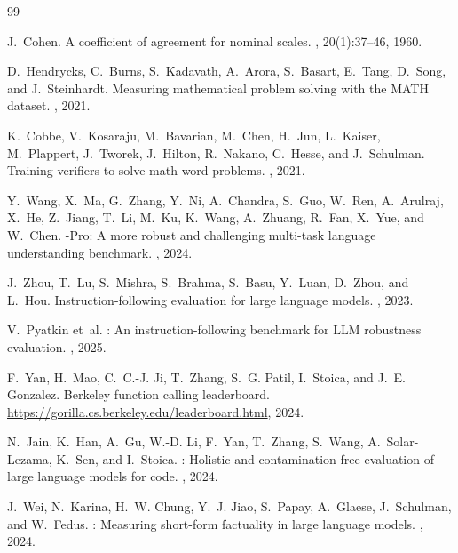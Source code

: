 \documentclass[11pt,a4paper]{article}
\begin{document}
\begin{thebibliography}{99}

J.~Cohen.
\newblock A coefficient of agreement for nominal scales.
, 20(1):37--46, 1960.

D.~Hendrycks, C.~Burns, S.~Kadavath, A.~Arora, S.~Basart, E.~Tang, D.~Song, and J.~Steinhardt.
\newblock Measuring mathematical problem solving with the {MATH} dataset.
, 2021.

K.~Cobbe, V.~Kosaraju, M.~Bavarian, M.~Chen, H.~Jun, L.~Kaiser, M.~Plappert, J.~Tworek, J.~Hilton, R.~Nakano, C.~Hesse, and J.~Schulman.
\newblock Training verifiers to solve math word problems.
, 2021.

Y.~Wang, X.~Ma, G.~Zhang, Y.~Ni, A.~Chandra, S.~Guo, W.~Ren, A.~Arulraj, X.~He, Z.~Jiang, T.~Li, M.~Ku, K.~Wang, A.~Zhuang, R.~Fan, X.~Yue, and W.~Chen.
-{Pro}: A more robust and challenging multi-task language understanding benchmark.
, 2024.

J.~Zhou, T.~Lu, S.~Mishra, S.~Brahma, S.~Basu, Y.~Luan, D.~Zhou, and L.~Hou.
\newblock Instruction-following evaluation for large language models.
, 2023.

V.~Pyatkin et~al.
: An instruction-following benchmark for {LLM} robustness evaluation.
, 2025.

F.~Yan, H.~Mao, C.~C.-J. Ji, T.~Zhang, S.~G. Patil, I.~Stoica, and J.~E. Gonzalez.
\newblock Berkeley function calling leaderboard.
\newblock \url{https://gorilla.cs.berkeley.edu/leaderboard.html}, 2024.

N.~Jain, K.~Han, A.~Gu, W.-D. Li, F.~Yan, T.~Zhang, S.~Wang, A.~Solar-Lezama, K.~Sen, and I.~Stoica.
: Holistic and contamination free evaluation of large language models for code.
, 2024.

J.~Wei, N.~Karina, H.~W. Chung, Y.~J. Jiao, S.~Papay, A.~Glaese, J.~Schulman, and W.~Fedus.
: Measuring short-form factuality in large language models.
, 2024.


\end{thebibliography}
\end{document}
